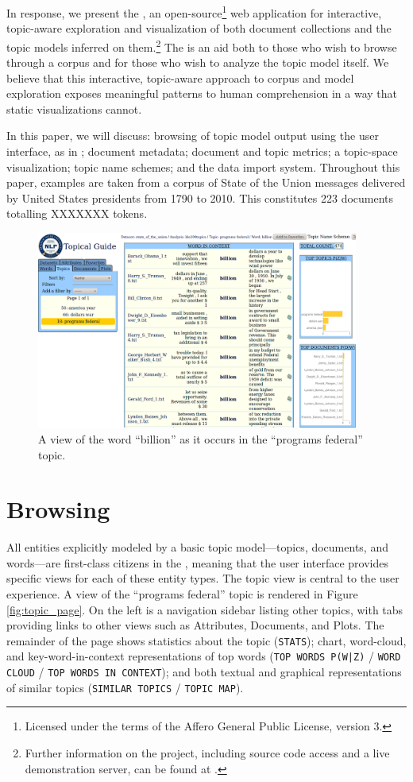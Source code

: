 \documentclass[11pt]{article}
\begin{document}
In response, we present the \tool, an open-source\footnote{Licensed under the terms of the Affero
General Public License, version 3.} web application for interactive,
topic-aware exploration and visualization of both document collections and the
topic models inferred on them.\footnote{Further information on the project, including
source code access and a live demonstration server, can be found
at \texttt{\projecturl}.} The \tool{} is an aid both to those who wish to
browse through a corpus and for those who wish to analyze the topic model itself.
We believe that this interactive, topic-aware approach to corpus and model exploration
exposes meaningful patterns to human comprehension in a way that static visualizations cannot.

In this paper, we will discuss: browsing of topic model output using the \tool{} user interface, as in \cite{gardner_browser_2010};
document metadata; document and topic metrics; a topic-space visualization;
topic name schemes; and the data import
system. Throughout this paper, examples are taken from a
corpus of State of the Union messages delivered by United States presidents
from 1790 to 2010. This constitutes 223 documents totalling XXXXXXX tokens. %

\begin{figure}[t]
 \centering
 \includegraphics[width=400px,keepaspectratio=true]{./topic_word_view2.png}
 \caption{A view of the word ``billion'' as it occurs in the ``programs federal'' topic.}
 \label{fig:topic_word}
\end{figure}
\section{Browsing}
All entities explicitly modeled by a basic topic model---topics, documents,
and words---are first-class citizens in the \tool, meaning that the user
interface provides specific views for each of these entity types. The topic view
is central to the user experience. A view of the ``programs federal'' topic is
rendered in Figure \ref{fig:topic_page}. On the left is a navigation sidebar listing other topics,
with tabs providing links to other views such as Attributes, Documents, and Plots.
The remainder of the page shows statistics about the topic
(\texttt{STATS}); chart, word-cloud, and key-word-in-context representations of top
words (\texttt{TOP WORDS P(W|Z)} / \texttt{WORD CLOUD} / \texttt{TOP WORDS IN CONTEXT}); and
both textual and graphical representations of similar topics (\texttt{SIMILAR
TOPICS} / \texttt{TOPIC MAP}).
\end{document}
